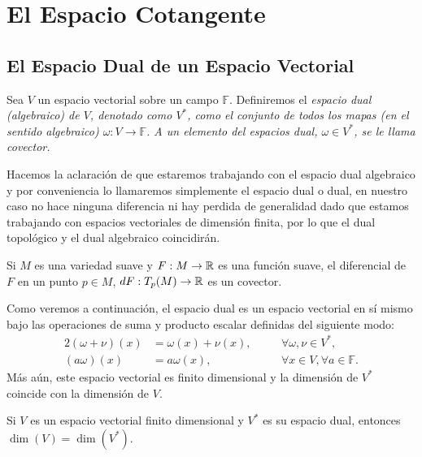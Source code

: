 \section{El Espacio Cotangente}\label{Sección: Espacio Cotangente}
\subsection{El Espacio Dual de un Espacio Vectorial}

\begin{definition}
	Sea $V$ un espacio vectorial sobre un campo $\mathbb{F}$. Definiremos el \it{espacio dual (algebraico) de $V$}, denotado como $V^*$, como el conjunto de todos los mapas (en el sentido algebraico) $\omega: V \to \mathbb{F}$. A un elemento del espacios dual, $\omega \in V^*$, se le llama \it{covector}.
\end{definition}

Hacemos la aclaración de que estaremos trabajando con el espacio dual algebraico y por conveniencia lo llamaremos simplemente el espacio dual o dual, en nuestro caso no hace ninguna diferencia ni hay perdida de generalidad dado que estamos trabajando con espacios vectoriales de dimensión finita, por lo que el dual topológico y el dual algebraico coincidirán.

\begin{example}
	Si $M$ es una variedad suave y $F: M \to \mathbb{R}$ es una función suave, el diferencial de $F$ en un punto $p \in M$, $dF: T_p(M) \to \mathbb{R}$ es un covector.
\end{example}

Como veremos a continuación, el espacio dual es un espacio vectorial en sí mismo bajo las operaciones de suma y producto escalar definidas del siguiente modo:
\begin{alignat*}{2}
	(\omega+\nu)(x) & =\omega(x)+\nu(x), \quad &  & \forall \omega,\nu \in V^{*},           \\
	(a\omega)(x)    & = a\omega(x), \quad      &  & \forall x\in V,\forall a \in\mathbb{F}.
\end{alignat*}
Más aún, este espacio vectorial es finito dimensional y la dimensión de $V^{*}$ coincide con la dimensión de $V$.

\begin{theorem}\label{Teorema: Dimensión del Espacio Dual}
	Si $V$ es un espacio vectorial finito dimensional y $V^{*}$ es su espacio dual, entonces $\dim(V) = \dim(V^{*})$.
\end{theorem}

